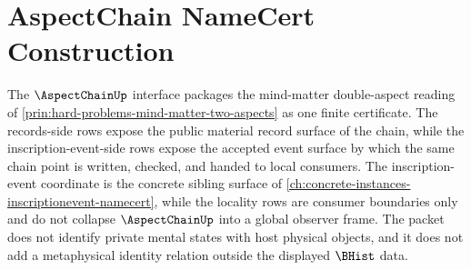 \chapter{AspectChain NameCert Construction}
\label{ch:concrete-instances-aspectchain-namecert}

The $\AspectChainUp$ interface packages the mind-matter double-aspect reading of \autoref{prin:hard-problems-mind-matter-two-aspects} as one finite certificate. The records-side rows expose the public material record surface of the chain, while the inscription-event-side rows expose the accepted event surface by which the same chain point is written, checked, and handed to local consumers. The inscription-event coordinate is the concrete sibling surface of \autoref{ch:concrete-instances-inscriptionevent-namecert}, while the locality rows are consumer boundaries only and do not collapse $\AspectChainUp$ into a global observer frame. The packet does not identify private mental states with host physical objects, and it does not add a metaphysical identity relation outside the displayed $\BHist$ data.

